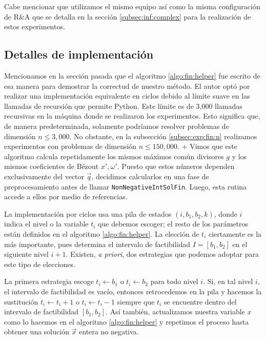 Cabe mencionar que utilizamos el mismo equipo así como la misma configuración de R\&A que se detalla
en la sección \ref{subsec:inf:complex} para la realización de estos experimentos.

\subsection{Detalles de implementación}
\label{subsec:fin:details}
\noindent
Mencionamos en la sección pasada que el algoritmo \ref{algo:fin:helper} fue escrito de esa manera para demostrar la
correctud de nuestro método. El autor optó por realizar una implementación equivalente en ciclos
debido al límite suave en las llamadas de recursión que permite Python. Este límite es de 3{,}000
llamadas recursivas en la máquina donde se realizaron los experimentos. Esto significa que, de
manera predeterminada, solamente podríamos resolver problemas de dimensión $n \leq 3{,}000$. No
obstante, en la subsección \ref{subsec:exp:fin:n} realizamos experimentos con problemas de dimensión
$n \leq 150{,}000$.
+ 
Vimos que este algoritmo calcula repetidamente los mismos máximos común divisores $g$ y los mismos
coeficientes de Bézout $x', \omega'$. Puesto que estos números dependen exclusivamente del vector
$\vec{q}$, decidimos calcularlos en una fase de preprocesamiento antes de llamar
\texttt{NonNegativeIntSolFin}. Luego, esta rutina accede a ellos por medio de referencias.

La implementación por ciclos usa una pila de estados $(i, b_1, b_2, k)$, donde $i$ indica el nivel o
la variable $t_i$ que debemos escoger; el resto de los parámetros están definidos en el algoritmo
\ref{algo:fin:helper}. La elección de $t_i$ ciertamente es la más importante, pues determina el
intervalo de factibilidad $I = [b_1, b_2]$ en el siguiente nivel $i + 1$. Existen, \textit{a
priori}, dos estrategias que podemos adoptar para este tipo de elecciones.

La primera estrategia escoge $t_i \leftarrow b_1$ o $t_i \leftarrow b_2$ para todo nivel
$i$. Si, en tal nivel $i$, el intervalo de factibilidad es vacío, entonces retrocedemos
en la pila y hacemos la sustitución $t_i \leftarrow t_i + 1$ o $t_i \leftarrow t_i - 1$ siempre que
$t_i$ se encuentre dentro del intervalo de factibilidad $[b_1, b_2]$. Así también, actualizamos nuestra
variable $x$ como lo hacemos en el algoritmo \ref{algo:fin:helper} y repetimos el proceso hasta
obtener una solución $\vec{x}$ entera no negativa.

